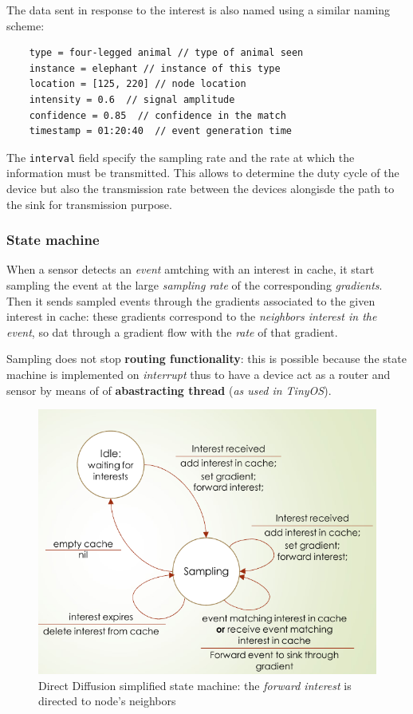 \documentclass[10pt,a4paper]{report}
\theoremstyle{definition}
\begin{document}
The data sent in response to the interest is also named using a similar naming scheme:
\begin{verbatim}
	type = four-legged animal // type of animal seen
	instance = elephant // instance of this type
	location = [125, 220] // node location
	intensity = 0.6  // signal amplitude
	confidence = 0.85  // confidence in the match
	timestamp = 01:20:40  // event generation time
\end{verbatim}

The \texttt{interval} field specify the sampling rate and the rate at which the information must be transmitted. This allows to determine the duty cycle of the device but also the transmission rate between the devices alongisde the path to the sink for transmission purpose.
\subsubsection{State machine}\label{sec:state-machine}
When a sensor detects an \textit{event} amtching with an interest in cache, it start sampling the event at the large \textit{sampling rate} of the corresponding \textit{gradients}. Then it sends sampled events through the gradients associated to the given interest in cache: these gradients correspond to the \textit{neighbors interest in the event}, so dat through a gradient flow with the \textit{rate} of that gradient.

Sampling does not stop \textbf{routing functionality}: this is possible because the state machine is implemented on \textit{interrupt} thus to have a device act as a router and sensor by means of of \textbf{abastracting thread} (\textit{as used in TinyOS}).
\begin{figure}[h]
	\centering\includegraphics[scale=0.50]{images/Pasted image 20230522174514.png}
	\caption{Direct Diffusion simplified state machine: the \textit{forward interest} is directed to node's neighbors}
\end{figure}
\end{document}
